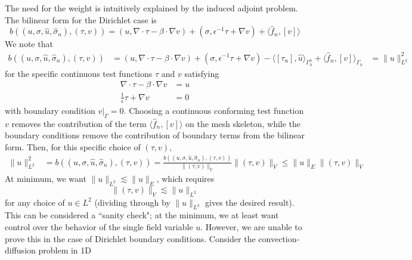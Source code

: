 \documentclass[11pt,onecolumn]{scrartcl}
\newcommand{\grad}{\nabla}
\renewcommand{\div}{\grad \cdot}
\begin{document}
The need for the weight is intuitively explained by the induced adjoint problem.  The bilinear form for the Dirichlet case is 
\[
b\left(\left(u,\sigma, \widehat{u}, \widehat{\sigma}_n\right), \left(\tau, v\right)\right) = \left(u,\div \tau - \beta \cdot \grad v\right) + \left(\sigma, \epsilon^{-1} \tau + \grad v\right) + \langle \widehat{f}_n, \left[v\right] \rangle
\]
We note that 
\begin{align*}
b\left(\left(u,\sigma, \widehat{u}, \widehat{\sigma}_n\right), \left(\tau, v\right)\right) &= \left(u,\div \tau - \beta \cdot \grad v\right) + \left(\sigma, \epsilon^{-1} \tau + \grad v\right) - \langle \left[\tau_n\right], \widehat{u} \rangle_{\Gamma_h^0} + \langle \widehat{f}_n, \left[v\right] \rangle_{\Gamma_h} 
&= \| u \|^2_{L^2}
\end{align*}
for the specific continuous test functions $\tau$ and $v$ satisfying
\begin{align*}
\div \tau - \beta \cdot \grad v &= u \\
\frac{1}{\epsilon}\tau + \grad v &= 0
\end{align*}
with boundary condition $\left.v\right|_\Gamma = 0$. Choosing a continuous conforming test function $v$ removes the contribution of the term $\langle \widehat{f}_n, \left[v\right] \rangle$ on the mesh skeleton, while the boundary conditions remove the contribution of boundary terms from the bilinear form.  Then, for this specific choice of $\left(\tau, v\right)$, 
\begin{align*}
\|u\|_{L^2}^2 &= b\left(\left(u,\sigma, \widehat{u}, \widehat{\sigma}_n\right), \left(\tau, v\right)\right) = \frac{b\left(\left(u,\sigma, \widehat{u}, \widehat{\sigma}_n\right), \left(\tau, v\right)\right)}{\|\left(\tau, v\right)\|_V}\|\left(\tau, v\right)\|_V \leq \|u\|_E \|\left(\tau, v\right)\|_V
\end{align*}
At minimum, we want $\|u\|_{L^2} \lesssim \|u\|_E$, which requires 
\[
\|\left(\tau, v\right)\|_V \lesssim \| u \|_{L^2}
\]
for any choice of $u \in L^2$ (dividing through by $\|u\|_{L^2}$ gives the desired result).  This can be considered a ``sanity check"; at the minimum, we at least want control over the behavior of the single field variable $u$.  However, we are unable to prove this in the case of Dirichlet boundary conditions. Consider the convection-diffusion problem in 1D
\end{document}
